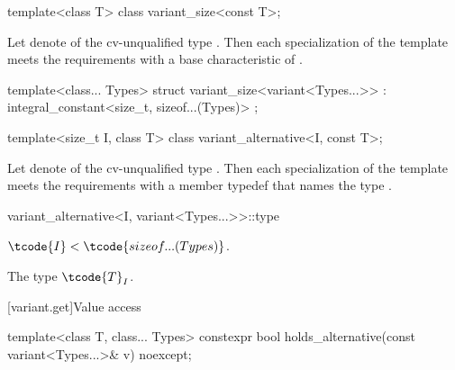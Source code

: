 %
\begin{itemdecl}
template<class T> class variant_size<const T>;
\end{itemdecl}

\begin{itemdescr}
\pnum
Let  denote  of the cv-unqualified
type . Then each specialization of the template meets the
 requirements with a
base characteristic of .
\end{itemdescr}

%
\begin{itemdecl}
template<class... Types>
  struct variant_size<variant<Types...>> : integral_constant<size_t, sizeof...(Types)> { };
\end{itemdecl}

%
\begin{itemdecl}
template<size_t I, class T> class variant_alternative<I, const T>;
\end{itemdecl}

\begin{itemdescr}
\pnum
Let  denote  of the
cv-unqualified type . Then each specialization of the template
meets the  requirements with a
member typedef  that names the type .
\end{itemdescr}

%
\begin{itemdecl}
variant_alternative<I, variant<Types...>>::type
\end{itemdecl}

\begin{itemdescr}
\pnum
\mandates
$\tcode{I} < \tcode{sizeof...(Types)}$.

\pnum
\ctype
The type $\tcode{T}_I$.
\end{itemdescr}

[variant.get]{Value access}

\begin{itemdecl}
template<class T, class... Types>
  constexpr bool holds_alternative(const variant<Types...>& v) noexcept;
\end{itemdecl}

